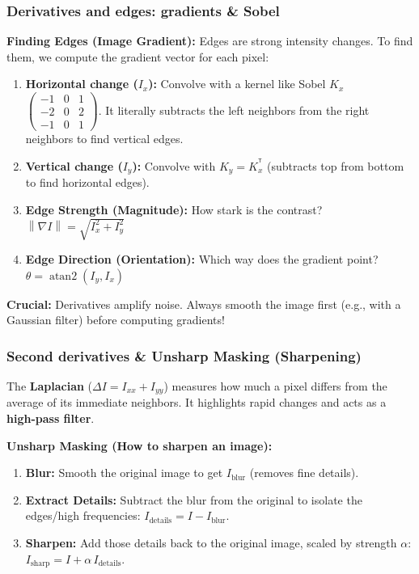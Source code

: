 \documentclass[11pt,a4paper]{article}
\newcommand{\T}{^\mathsf{T}}
\newcommand{\norm}[1]{\left\lVert#1\right\rVert}
\begin{document}
\subsubsection{Derivatives and edges: gradients \& Sobel}

\begin{mathrule}
\textbf{Finding Edges (Image Gradient):}
Edges are strong intensity changes. To find them, we compute the gradient vector for each pixel:
\begin{enumerate}
  \item \textbf{Horizontal change ($I_x$):} Convolve with a kernel like Sobel $K_x$ $\left(\begin{smallmatrix}-1&0&1\\-2&0&2\\-1&0&1\end{smallmatrix}\right)$. It literally subtracts the left neighbors from the right neighbors to find vertical edges.
  \item \textbf{Vertical change ($I_y$):} Convolve with $K_y=K_x^{\T}$ (subtracts top from bottom to find horizontal edges).
  \item \textbf{Edge Strength (Magnitude):} How stark is the contrast? $\norm{\nabla I} = \sqrt{I_x^2 + I_y^2}$
  \item \textbf{Edge Direction (Orientation):} Which way does the gradient point? $\theta = \operatorname{atan2}(I_y, I_x)$
\end{enumerate}
\end{mathrule}

\begin{notebox}
\textbf{Crucial:} Derivatives amplify noise. Always smooth the image first (e.g., with a Gaussian filter) before computing gradients!
\end{notebox}

\subsubsection{Second derivatives \& Unsharp Masking (Sharpening)}

\begin{defbox}
The \textbf{Laplacian} ($\Delta I = I_{xx} + I_{yy}$) measures how much a pixel differs from the average of its immediate neighbors. It highlights rapid changes and acts as a \textbf{high-pass filter}.
\end{defbox}

\begin{mathrule}
\textbf{Unsharp Masking (How to sharpen an image):}
\begin{enumerate}
  \item \textbf{Blur:} Smooth the original image to get $I_{\text{blur}}$ (removes fine details).
  \item \textbf{Extract Details:} Subtract the blur from the original to isolate the edges/high frequencies: $I_{\text{details}} = I - I_{\text{blur}}$.
  \item \textbf{Sharpen:} Add those details back to the original image, scaled by strength $\alpha$: $I_{\text{sharp}} = I + \alpha\,I_{\text{details}}$.
\end{enumerate}
\end{mathrule}
\end{document}
